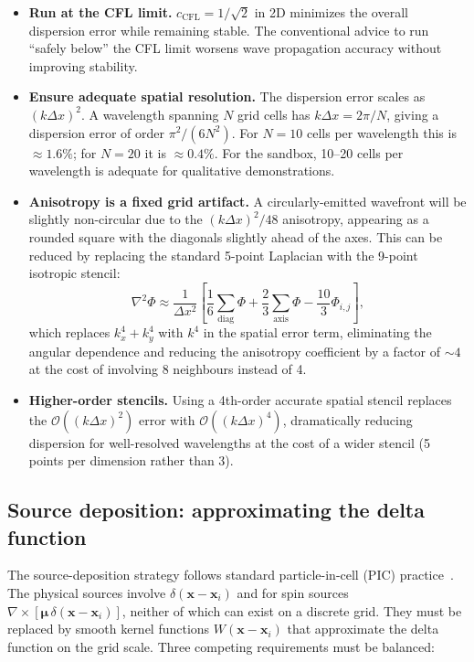 \documentclass[11pt,a4paper]{article}
\newcommand{\vv}[1]{\mathbf{#1}}
\newcommand{\order}[1]{\mathcal{O}(#1)}
\begin{document}
\begin{itemize}
  \item \textbf{Run at the CFL limit.} $c_{\mathrm{CFL}} = 1/\sqrt{2}$ in 2D minimizes the overall dispersion error while remaining stable.  The conventional advice to run ``safely below'' the CFL limit worsens wave propagation accuracy without improving stability.
  \item \textbf{Ensure adequate spatial resolution.}  The dispersion error scales as $(k\Delta x)^2$.  A wavelength spanning $N$ grid cells has $k\Delta x = 2\pi/N$, giving a dispersion error of order $\pi^2/(6N^2)$.  For $N=10$ cells per wavelength this is $\approx 1.6\%$; for $N=20$ it is $\approx 0.4\%$.  For the sandbox, 10--20 cells per wavelength is adequate for qualitative demonstrations.
  \item \textbf{Anisotropy is a fixed grid artifact.}  A circularly-emitted wavefront will be slightly non-circular due to the $(k\Delta x)^2/48$ anisotropy, appearing as a rounded square with the diagonals slightly ahead of the axes.  This can be reduced by replacing the standard 5-point Laplacian with the 9-point isotropic stencil:
  \begin{equation}
    \nabla^2\Phi \approx \frac{1}{\Delta x^2}\!\left[\frac{1}{6}\sum_{\mathrm{diag}}\Phi + \frac{2}{3}\sum_{\mathrm{axis}}\Phi - \frac{10}{3}\Phi_{i,j}\right],
  \end{equation}
  which replaces $k_x^4+k_y^4$ with $k^4$ in the spatial error term, eliminating the angular dependence and reducing the anisotropy coefficient by a factor of $\sim\!4$ at the cost of involving 8 neighbours instead of 4.
  \item \textbf{Higher-order stencils.}  Using a 4th-order accurate spatial stencil replaces the $\order{(k\Delta x)^2}$ error with $\order{(k\Delta x)^4}$, dramatically reducing dispersion for well-resolved wavelengths at the cost of a wider stencil (5 points per dimension rather than 3).
\end{itemize}

\subsection{Source deposition: approximating the delta function}
\label{sec:deposition}

The source-deposition strategy follows standard particle-in-cell (PIC) practice~\cite{HockneyEastwood1988,BirdsallLangdon1991}.  The physical sources involve $\delta(\vv{x}-\vv{x}_i)$ and for spin sources $\nabla\times[\boldsymbol{\mu}\,\delta(\vv{x}-\vv{x}_i)]$, neither of which can exist on a discrete grid.  They must be replaced by smooth kernel functions $W(\vv{x}-\vv{x}_i)$ that approximate the delta function on the grid scale.  Three competing requirements must be balanced:
\end{document}
